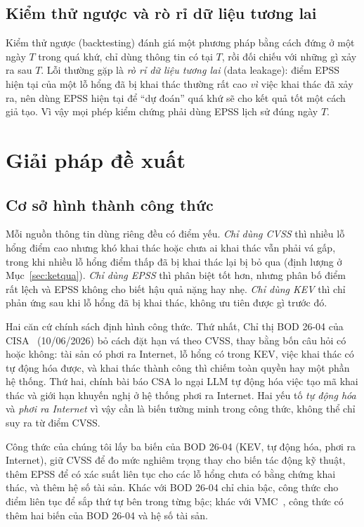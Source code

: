 \documentclass[runningheads]{llncs}
\begin{document}
\subsection{Kiểm thử ngược và rò rỉ dữ liệu tương lai}
Kiểm thử ngược (backtesting) đánh giá một phương pháp bằng cách đứng ở một ngày $T$ trong
quá khứ, chỉ dùng thông tin có tại $T$, rồi đối chiếu với những gì xảy ra sau $T$. Lỗi
thường gặp là \emph{rò rỉ dữ liệu tương lai} (data leakage): điểm EPSS hiện tại của một lỗ
hổng đã bị khai thác thường rất cao \emph{vì} việc khai thác đã xảy ra, nên dùng EPSS hiện
tại để ``dự đoán'' quá khứ sẽ cho kết quả tốt một cách giả tạo. Vì vậy mọi phép kiểm chứng phải dùng
EPSS lịch sử đúng ngày $T$.

\section{Giải pháp đề xuất}\label{sec:giaiphap}

\subsection{Cơ sở hình thành công thức}

Mỗi nguồn thông tin dùng riêng đều có điểm yếu. \emph{Chỉ dùng CVSS} thì nhiều lỗ hổng điểm cao nhưng
khó khai thác hoặc chưa ai khai thác vẫn phải vá gấp, trong khi nhiều lỗ hổng điểm thấp đã bị khai thác
lại bị bỏ qua (định lượng ở Mục~\ref{sec:ketqua}). \emph{Chỉ dùng EPSS} thì phân biệt tốt hơn, nhưng
phân bố điểm rất lệch và EPSS không cho biết hậu quả nặng hay nhẹ. \emph{Chỉ dùng KEV} thì chỉ phản ứng
sau khi lỗ hổng đã bị khai thác, không ưu tiên được gì trước đó.

Hai căn cứ chính sách định hình công thức. Thứ nhất, Chỉ thị BOD 26-04 của CISA~\cite{bod2604}
(10/06/2026) bỏ cách đặt hạn vá theo CVSS, thay bằng bốn câu hỏi có hoặc không: tài sản có phơi ra
Internet, lỗ hổng có trong KEV, việc khai thác có tự động hóa được, và khai thác thành công thì chiếm toàn quyền
hay một phần hệ thống. Thứ hai, chính bài báo CSA lo ngại LLM tự động hóa việc tạo mã khai thác và giới
hạn khuyến nghị ở hệ thống phơi ra Internet. Hai yếu tố \emph{tự động hóa} và \emph{phơi ra Internet}
vì vậy cần là biến tường minh trong công thức, không thể chỉ suy ra từ điểm CVSS.

Công thức của chúng tôi lấy ba biến của BOD 26-04 (KEV, tự động hóa, phơi ra Internet), giữ CVSS để đo
mức nghiêm trọng thay cho biến tác động kỹ thuật, thêm EPSS để có xác suất liên tục cho các lỗ hổng chưa
có bằng chứng khai thác, và thêm hệ số tài sản. Khác với BOD 26-04 chỉ chia bậc, công thức cho điểm liên
tục để sắp thứ tự bên trong từng bậc; khác với VMC~\cite{shimizu2026}, công thức có thêm hai biến của
BOD 26-04 và hệ số tài sản.
\end{document}
